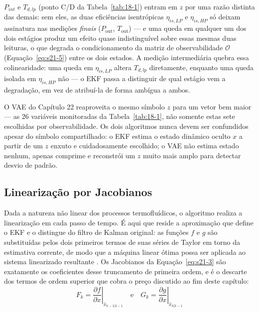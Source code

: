 \documentclass[12pt,a4paper]{article}
\numberwithin{equation}{section}
\numberwithin{table}{section}
\numberwithin{figure}{section}
\begin{document}
{	$P_{int}$ e $T_{d,lp}$ (ponto C/D da Tabela~\ref{tab:18-1}) entram em $z$ por uma razão distinta das demais: sem eles, as duas eficiências isentrópicas $\eta_{is,LP}$ e $\eta_{is,HP}$ só deixam assinatura nas medições \textit{finais} ($P_{\text{out}}$, $T_{\text{out}}$) — e uma queda em qualquer um dos dois estágios produz um efeito quase indistinguível sobre essas mesmas duas leituras, o que degrada o condicionamento da matriz de observabilidade $\mathcal{O}$ (Equação~\eqref{eq:s21-5}) entre os dois estados. A medição intermediária quebra essa colinearidade: uma queda em $\eta_{is,LP}$ altera $T_{d,lp}$ diretamente, enquanto uma queda isolada em $\eta_{is,HP}$ não — o EKF passa a distinguir de qual estágio vem a degradação, em vez de atribuí-la de forma ambígua a ambos.

	O VAE do Capítulo 22 reaproveita o mesmo símbolo $z$ para um vetor bem maior — as 26 variáveis monitoradas da Tabela~\ref{tab:18-1}, não somente estas sete escolhidas por observabilidade. Os dois algoritmos nunca devem ser confundidos apesar do símbolo compartilhado: o EKF estima o estado dinâmico oculto $x$ a partir de um $z$ enxuto e cuidadosamente escolhido; o VAE não estima estado nenhum, apenas comprime e reconstrói um $z$ muito mais amplo para detectar desvio de padrão.

	\subsection{Linearização por Jacobianos}
	Dada a natureza não linear dos processos termofluídicos, o algoritmo realiza a linearização em cada passo de tempo. É aqui que reside a aproximação que define o EKF e o distingue do filtro de Kalman original: as funções $f$ e $g$ são substituídas pelos dois primeiros termos de suas séries de Taylor em torno da estimativa corrente, de modo que a máquina linear ótima possa ser aplicada ao sistema linearizado resultante \cite[Cap.~13]{simon}. Os Jacobianos da Equação~\eqref{eq:s21-3} são exatamente os coeficientes desse truncamento de primeira ordem, e é o descarte dos termos de ordem superior que cobra o preço discutido ao fim deste capítulo:
	\begin{equation}\label{eq:s21-3}
	F_k = \left. \frac{\partial f}{\partial x} \right|_{\hat{x}_{k-1|k-1}} \quad \text{e} \quad G_k = \left. \frac{\partial g}{\partial x} \right|_{\hat{x}_{k|k-1}}
\end{equation}

}
\end{document}
